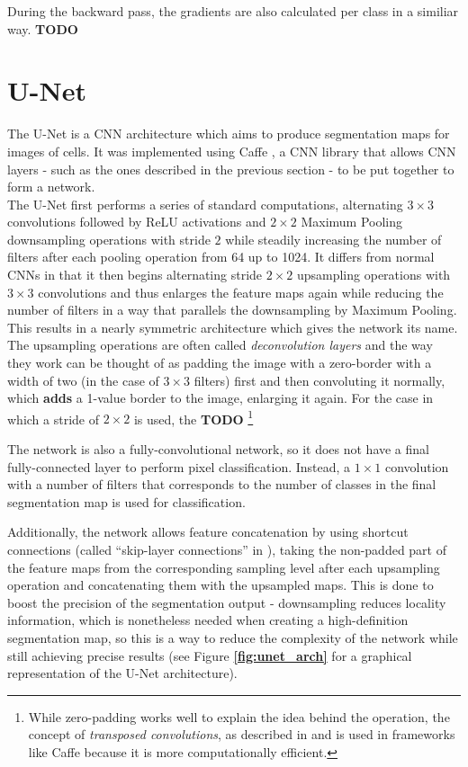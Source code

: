 During the backward pass, the gradients are also calculated per class in a similiar way. \textbf{TODO}


	\section {U-Net}
\label{sec:unet}
The U-Net \cite{unet} is a CNN architecture which aims to produce segmentation maps for images of cells. It was implemented using Caffe \cite{caffe}, a CNN library that allows CNN layers - such as the ones described in the previous section - to be put together to form a network.\\

The U-Net first performs a series of standard computations, alternating $3 \times 3$ convolutions followed by ReLU activations and $2 \times 2$ Maximum Pooling downsampling operations with stride $2$ while steadily increasing the number of filters after each pooling operation from 64 up to 1024. It differs from normal CNNs in that it then begins alternating stride $2 \times 2$ upsampling operations with $3 \times 3$ convolutions and thus enlarges the feature maps again while reducing the number of filters in a way that parallels the downsampling by Maximum Pooling. This results in a nearly symmetric architecture which gives the network its name. The upsampling operations are often called \textit{deconvolution layers} and the way they work can be thought of as padding the image with a zero-border with a width of two (in the case of $3 \times 3$ filters) first and then convoluting it normally, which \textbf{adds} a 1-value border to the image, enlarging it again. For the case in which a stride of $2 \times 2$ is used, the \textbf{TODO} \footnote{While zero-padding works well to explain the idea behind the operation, the concept of \textit{transposed convolutions}, as described in \cite[p. 18]{transposed_conv} and \cite{up_conv} is used in frameworks like Caffe because it is more computationally efficient.} \cite[p. 14]{transposed_conv}\cite{up_conv}

The network is also a fully-convolutional network, so it does not have a final fully-connected layer to perform pixel classification. Instead, a $1 \times 1$ convolution with a number of filters that corresponds to the number of classes in the final segmentation map is used for classification.

Additionally, the network allows feature concatenation by using shortcut connections (called ``skip-layer connections'' in \cite{bishop_pattern}), taking the non-padded part of the feature maps from the corresponding sampling level after each upsampling operation and concatenating them with the upsampled maps. This is done to boost the precision of the segmentation output - downsampling reduces locality information, which is nonetheless needed when creating a high-definition segmentation map, so this is a way to reduce the complexity of the network while still achieving precise results (see Figure \textbf{\ref{fig:unet_arch}} for a graphical representation of the U-Net architecture).\\

